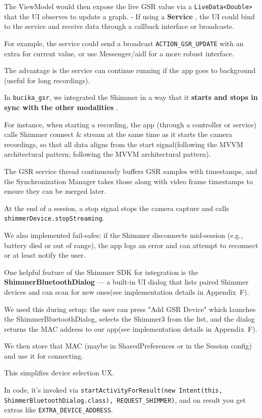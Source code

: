 {{The ViewModel would then expose the live GSR value via a \texttt{LiveData<Double>} that the UI observes to update a graph. - If using a \textbf{Service}
, the UI could bind to the service and receive data through a callback interface or broadcasts.

For example, the service could send a broadcast \texttt{ACTION_GSR_UPDATE} with an extra for current value, or use Messenger/aidl for a more robust interface.

The advantage is the service can continue running if the app goes to background (useful for long recordings).

In \texttt{bucika_gsr}, we integrated the Shimmer in a way that it \textbf{starts and stops in sync with the other modalities}
.

For instance, when starting a recording, the app (through a controller or service) calls Shimmer connect & stream at the same time as it starts the camera recordings, so that all data aligns from the start signal(following the MVVM architectural pattern; following the MVVM architectural pattern).

The GSR service thread continuously buffers GSR samples with timestamps, and the Synchronization Manager takes those along with video frame timestamps to ensure they can be merged later.

At the end of a session, a stop signal stops the camera capture and calls \texttt{shimmerDevice.stopStreaming}.

We also implemented fail-safes: if the Shimmer disconnects mid-session (e.g., battery died or out of range), the app logs an error and can attempt to reconnect or at least notify the user.

One helpful feature of the Shimmer SDK for integration is the \textbf{ShimmerBluetoothDialog}
 --- a built-in UI dialog that lists paired Shimmer devices and can scan for new ones(see implementation details in Appendix~F).

We used this during setup: the user can press "Add GSR Device" which launches the ShimmerBluetoothDialog, selects the Shimmer3 from the list, and the dialog returns the MAC address to our app(see implementation details in Appendix~F).

We then store that MAC (maybe in SharedPreferences or in the Session config) and use it for connecting.

This simplifies device selection UX.

In code, it's invoked via \texttt{startActivityForResult(new Intent(this, ShimmerBluetoothDialog.class), REQUEST_SHIMMER)}, and on result you get extras like \texttt{EXTRA_DEVICE_ADDRESS}.

}}
